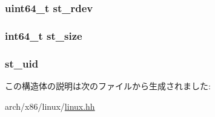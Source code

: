 \hypertarget{structX86Linux32_1_1____attribute_____ac430407fd3b0e421da1ee8f66c95a786}{
\subsubsection[{st\_\-rdev}]{\setlength{\rightskip}{0pt plus 5cm}uint64\_\-t {\bf st\_\-rdev}}}
\label{structX86Linux32_1_1____attribute_____ac430407fd3b0e421da1ee8f66c95a786}
\hypertarget{structX86Linux32_1_1____attribute_____aec608d79c93ed6d010aec9f7487e0064}{
\subsubsection[{st\_\-size}]{\setlength{\rightskip}{0pt plus 5cm}int64\_\-t {\bf st\_\-size}}}
\label{structX86Linux32_1_1____attribute_____aec608d79c93ed6d010aec9f7487e0064}
\hypertarget{structX86Linux32_1_1____attribute_____ad5477a292a4edf27aa5766e01e0f5d1f}{
\subsubsection[{st\_\-uid}]{ {\bf st\_\-uid}}}
\label{structX86Linux32_1_1____attribute_____ad5477a292a4edf27aa5766e01e0f5d1f}


この構造体の説明は次のファイルから生成されました:\begin{DoxyCompactItemize}
\item 
arch/x86/linux/\hyperlink{arch_2x86_2linux_2linux_8hh}{linux.hh}\end{DoxyCompactItemize}
